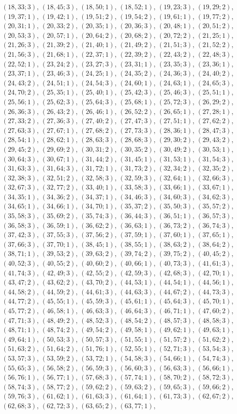 \documentclass[11pt]{article}
\begin{document}
$(18,33;3)$, $(18,45;3)$, $(18,50;1)$, $(18,52;1)$, $(19,23;3)$, $(19,29;2)$, $(19,37;1)$, $(19,42;1)$, $(19,51;2)$, $(19,54;2)$, $(19,61;1)$, $(19,77;2)$, $(20,31;1)$, $(20,33;2)$, $(20,35;1)$, $(20,36;3)$, $(20,48;1)$, $(20,51;2)$, $(20,53;3)$, $(20,57;1)$, $(20,64;2)$, $(20,68;2)$, $(20,72;2)$, $(21,25;1)$, $(21,26;3)$, $(21,39;2)$, $(21,40;1)$, $(21,49;2)$, $(21,51;3)$, $(21,52;2)$, $(21,56;3)$, $(21,68;1)$, $(22,37;1)$, $(22,39;2)$, $(22,43;2)$, $(22,48;3)$, $(22,52;1)$, $(23,24;2)$, $(23,27;3)$, $(23,31;1)$, $(23,35;3)$, $(23,36;1)$, $(23,37;1)$, $(23,46;3)$, $(24,25;1)$, $(24,35;2)$, $(24,36;3)$, $(24,40;2)$, $(24,43;2)$, $(24,51;1)$, $(24,54;3)$, $(24,60;1)$, $(24,63;1)$, $(24,65;3)$, $(24,70;2)$, $(25,35;1)$, $(25,40;1)$, $(25,42;3)$, $(25,46;3)$, $(25,51;1)$, $(25,56;1)$, $(25,62;3)$, $(25,64;3)$, $(25,68;1)$, $(25,72;3)$, $(26,29;2)$, $(26,36;3)$, $(26,43;2)$, $(26,46;1)$, $(26,52;2)$, $(26,65;1)$, $(27,28;1)$, $(27,33;2)$, $(27,36;3)$, $(27,40;2)$, $(27,47;3)$, $(27,51;1)$, $(27,62;2)$, $(27,63;3)$, $(27,67;1)$, $(27,68;2)$, $(27,73;3)$, $(28,36;1)$, $(28,47;3)$, $(28,54;1)$, $(28,62;1)$, $(28,63;3)$, $(28,68;3)$, $(29,30;2)$, $(29,43;2)$, $(29,45;2)$, $(29,69;2)$, $(30,31;2)$, $(30,35;2)$, $(30,49;2)$, $(30,53;1)$, $(30,64;3)$, $(30,67;1)$, $(31,44;2)$, $(31,45;1)$, $(31,53;1)$, $(31,54;3)$, $(31,63;3)$, $(31,64;3)$, $(31,72;1)$, $(31,73;2)$, $(32,34;2)$, $(32,35;2)$, $(32,38;3)$, $(32,51;2)$, $(32,58;3)$, $(32,59;3)$, $(32,64;1)$, $(32,66;3)$, $(32,67;3)$, $(32,77;2)$, $(33,40;1)$, $(33,58;3)$, $(33,66;1)$, $(33,67;1)$, $(34,35;1)$, $(34,36;2)$, $(34,37;1)$, $(34,46;3)$, $(34,60;3)$, $(34,62;3)$, $(34,65;1)$, $(34,66;1)$, $(34,70;1)$, $(35,37;2)$, $(35,50;3)$, $(35,57;2)$, $(35,58;3)$, $(35,69;2)$, $(35,74;3)$, $(36,44;3)$, $(36,51;1)$, $(36,57;3)$, $(36,58;3)$, $(36,59;1)$, $(36,62;2)$, $(36,63;1)$, $(36,73;2)$, $(36,74;3)$, $(37,42;3)$, $(37,55;3)$, $(37,56;2)$, $(37,59;1)$, $(37,60;1)$, $(37,65;1)$, $(37,66;3)$, $(37,70;1)$, $(38,45;1)$, $(38,55;1)$, $(38,63;2)$, $(38,64;2)$, $(38,71;1)$, $(39,53;2)$, $(39,63;2)$, $(39,74;2)$, $(39,75;2)$, $(40,45;2)$, $(40,52;3)$, $(40,55;2)$, $(40,60;2)$, $(40,66;1)$, $(40,73;3)$, $(41,61;3)$, $(41,74;3)$, $(42,49;3)$, $(42,55;2)$, $(42,59;3)$, $(42,68;3)$, $(42,70;1)$, $(43,47;2)$, $(43,62;2)$, $(43,70;2)$, $(44,53;1)$, $(44,54;1)$, $(44,56;1)$, $(44,58;2)$, $(44,59;2)$, $(44,61;3)$, $(44,63;3)$, $(44,67;2)$, $(44,73;3)$, $(44,77;2)$, $(45,55;1)$, $(45,59;3)$, $(45,61;1)$, $(45,64;3)$, $(45,70;1)$, $(45,77;2)$, $(46,58;1)$, $(46,63;3)$, $(46,64;3)$, $(46,71;1)$, $(47,60;2)$, $(47,71;3)$, $(48,49;2)$, $(48,52;3)$, $(48,54;2)$, $(48,57;3)$, $(48,58;3)$, $(48,71;1)$, $(48,74;2)$, $(49,54;2)$, $(49,58;1)$, $(49,62;1)$, $(49,63;1)$, $(49,64;1)$, $(50,53;3)$, $(50,57;3)$, $(51,55;1)$, $(51,57;2)$, $(51,62;2)$, $(51,63;2)$, $(51,64;2)$, $(51,76;1)$, $(52,55;1)$, $(52,71;3)$, $(53,54;3)$, $(53,57;3)$, $(53,59;2)$, $(53,72;1)$, $(54,58;3)$, $(54,66;1)$, $(54,74;3)$, $(55,65;3)$, $(56,58;2)$, $(56,59;3)$, $(56,60;3)$, $(56,63;3)$, $(56,66;1)$, $(56,76;1)$, $(56,77;1)$, $(57,68;3)$, $(57,74;1)$, $(58,70;2)$, $(58,72;3)$, $(58,74;3)$, $(58,77;2)$, $(59,62;2)$, $(59,63;2)$, $(59,65;3)$, $(59,66;2)$, $(59,76;3)$, $(61,62;1)$, $(61,63;3)$, $(61,64;1)$, $(61,73;3)$, $(62,67;2)$, $(62,68;3)$, $(62,72;3)$, $(63,65;2)$, $(63,77;1)$, 
\end{document}
